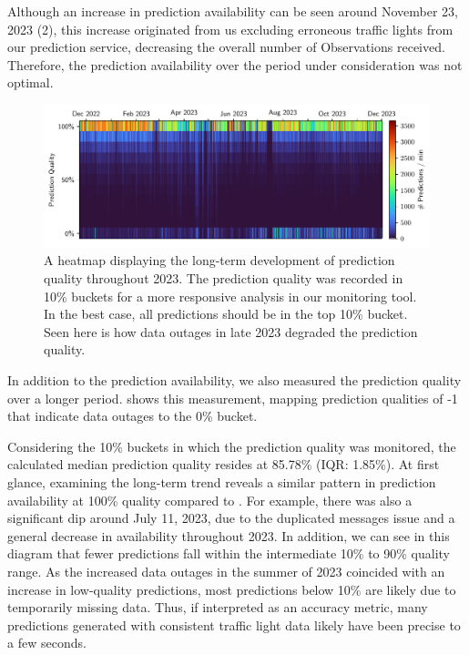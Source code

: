 Although an increase in prediction availability can be seen around November 23, 2023 (2), this increase originated from us excluding erroneous traffic lights from our prediction service, decreasing the overall number of Observations received. Therefore, the prediction availability over the period under consideration was not optimal.

\begin{figure}[t]
    \centering
    \includegraphics[width=\linewidth]{images/monitoring-long-term-study.pdf}
    \caption{A heatmap displaying the long-term development of prediction quality throughout 2023. The prediction quality was recorded in 10\% buckets for a more responsive analysis in our monitoring tool. In the best case, all predictions should be in the top 10\% bucket. Seen here is how data outages in late 2023 degraded the prediction quality.}\label{fig:monitoring-long-term-study}
\end{figure}

In addition to the prediction availability, we also measured the prediction quality over a longer period.  shows this measurement, mapping prediction qualities of -1 that indicate data outages to the 0\% bucket. 

Considering the 10\% buckets in which the prediction quality was monitored, the calculated median prediction quality resides at 85.78\% (IQR: 1.85\%). At first glance, examining the long-term trend reveals a similar pattern in prediction availability at 100\% quality compared to . For example, there was also a significant dip around July 11, 2023, due to the duplicated messages issue and a general decrease in availability throughout 2023. In addition, we can see in this diagram that fewer predictions fall within the intermediate 10\% to 90\% quality range. As the increased data outages in the summer of 2023 coincided with an increase in low-quality predictions, most predictions below 10\% are likely due to temporarily missing data. Thus, if interpreted as an accuracy metric, many predictions generated with consistent traffic light data likely have been precise to a few seconds.

